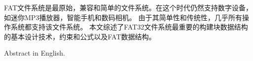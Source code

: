\begin{cabstract}
FAT文件系统是最原始，兼容和简单的文件系统。在这个时代仍然支持数字设备，如迷你MP3播放器，智能手机和数码相机。 由于其简单性和传统性，几乎所有操作系统都支持该文件系统。 本文综述了FAT32文件系统最重要的构建块数据结构的基本设计技术，约束和公式以及FAT数据结构。
\end{cabstract}


\begin{eabstract}
Abstract in English.
\end{eabstract}

